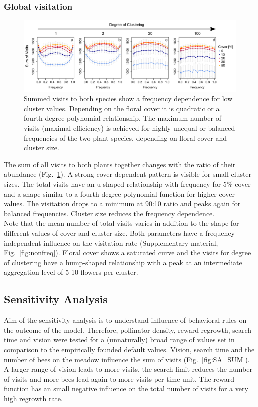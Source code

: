 \subsubsection*{Global visitation}

\begin{figure} [!ht] %
	\centering
	\includegraphics[width=16cm]{Images/SUM}
	\caption{Summed visits to both species show a frequency dependence for low cluster values. Depending on the floral cover it is quadratic or a fourth-degree polynomial relationship. The maximum number of visits (maximal efficiency) is achieved for highly unequal or balanced frequencies of the two plant species, depending on floral cover and cluster size.}
	\label{fig:SUM}
\end{figure}

The sum of all visits to both plants together changes with the ratio of their abundance (Fig.~\ref{fig:SUM}). A strong cover-dependent pattern is visible for small cluster sizes. The total visits have an u-shaped relationship with frequency for 5\% cover and a shape similar to a fourth-degree polynomial function for higher cover values. The visitation drops to a minimum at 90:10 ratio and peaks again for balanced frequencies. Cluster size reduces the frequency dependence. \\
Note that the mean number of total visits varies in addition to the shape for different values of cover and cluster size. Both parameters have a frequency independent influence on the visitation rate (Supplementary material, Fig.~\ref{fig:nonfreq}). Floral cover shows a saturated curve and the visits for degree of clustering have a hump-shaped relationship with a peak at an intermediate aggregation level of 5-10 flowers per cluster.

\subsection*{Sensitivity Analysis}
Aim of the sensitivity analysis is to understand influence of behavioral rules on the outcome of the model. Therefore, pollinator density, reward regrowth, search time and vision were tested for a (unnaturally) broad range of values set in comparison to the empirically founded default values. Vision, search time and the number of bees on the meadow influence the sum of visits (Fig.~\ref{fig:SA_SUM}). A larger range of vision leads to more visits, the search limit reduces the number of visits and more bees lead again to more visits per time unit. The reward function has an small negative influence on the total number of visits for a very high regrowth rate.

